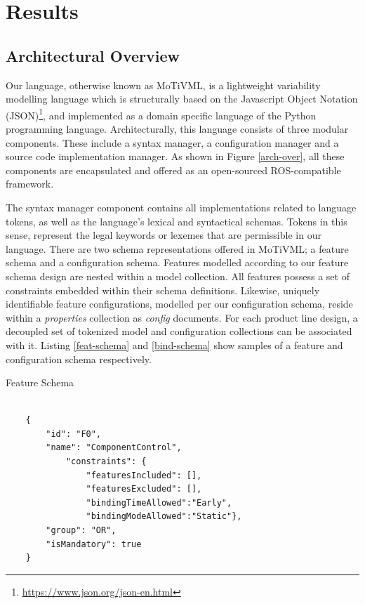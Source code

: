 \documentclass[conference]{IEEEtran}
\newcommand{\foot}[1]{\footnote{\url{#1}}}
\begin{document}
\section{Results}
\subsection{Architectural Overview}
Our language, otherwise known as MoTiVML, is a lightweight variability modelling language which is structurally based on the Javascript Object Notation (JSON)\foot{https://www.json.org/json-en.html}, and implemented as a domain specific language of the Python programming language. Architecturally, this language consists of three modular components. These include a syntax manager, a configuration manager and a source code implementation manager. As shown in Figure \ref{arch-over}, all these components are encapsulated and offered as an open-sourced ROS-compatible framework.

The syntax manager component contains all implementations related to language tokens, as well as the language's lexical and syntactical schemas. Tokens in this sense, represent the legal keywords or lexemes that are permissible in our language. There are two schema representations offered in MoTiVML; a feature schema and a configuration schema. Features modelled according to our feature schema design are nested within a model collection. All features possess a set of constraints embedded within their schema definitions. Likewise, uniquely identifiable feature configurations, modelled per our configuration schema, reside within a \textit{properties} collection as \textit{config} documents. For each product line design, a decoupled set of tokenized model and configuration collections can be associated with it. Listing \ref{feat-schema} and \ref{bind-schema} show samples of a feature and configuration schema respectively.

\begin{listing}[H]
\caption{Feature Schema}
\begin{verbatim}

    {
        "id": "F0",
        "name": "ComponentControl",
            "constraints": {
	            "featuresIncluded": [],
	            "featuresExcluded": [],
	            "bindingTimeAllowed":"Early",
	            "bindingModeAllowed":"Static"},
        "group": "OR",
        "isMandatory": true
    }

\end{verbatim}
\label{feat-schema}
\end{listing}
\end{document}
